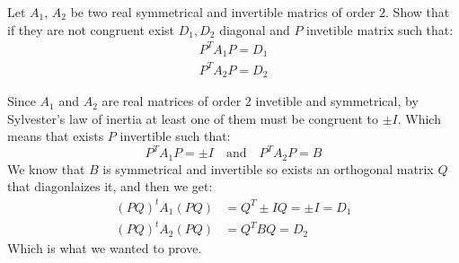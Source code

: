 \documentclass[11pt, a4paper]{article}
\begin{document}
\begin{exercise}
  Let $A_1$, $A_2$ be two real symmetrical and invertible matrics of 
  order $2$. Show that if they are not congruent exist $D_1, D_2$ diagonal
  and $P$ invetible matrix such that:
  \begin{align*}
    P^TA_1P = D_1 \\
    P^TA_2P = D_2
  \end{align*}
\end{exercise}
\begin{solution}
  Since $A_1$ and $A_2$ are real matrices of order $2$ invetible and 
  symmetrical, by Sylvester's law of inertia at least one of them
  must be congruent to $\pm I$. Which means that exists $P$ invertible 
  such that:
  \[
    P^T A_1 P = \pm I \quad \text{and} \quad 
    P^T A_2 P = B
  \]
  We know that $B$ is symmetrical and invertible so exists an orthogonal
  matrix $Q$ that diagonlaizes it, and then we get:
  \begin{align*}
    (PQ)^t A_1 (PQ) &= Q^T \pm I Q = \pm I = D_1 \\
    (PQ)^t A_2 (PQ) &= Q^T B Q = D_2
  \end{align*}
  Which is what we wanted to prove.
\end{solution}
\end{document}
